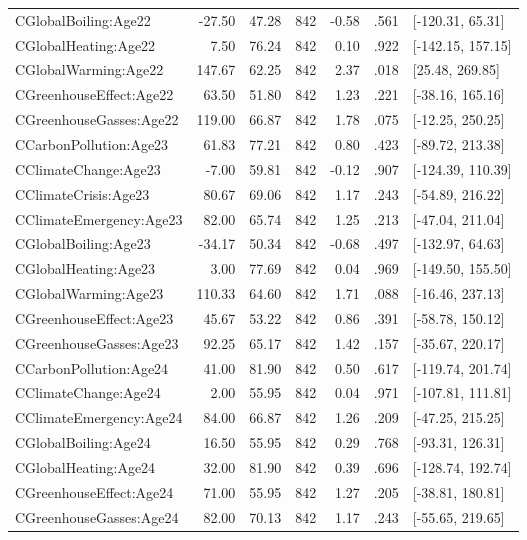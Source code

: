 \begin{table}[ht]
\begin{tabular}{lrrrrrl}
  CGlobalBoiling:Age22 & -27.50 & 47.28 & 842 & -0.58 & .561 & [-120.31, 65.31] \\ 
  CGlobalHeating:Age22 & 7.50 & 76.24 & 842 & 0.10 & .922 & [-142.15, 157.15] \\ 
  CGlobalWarming:Age22 & 147.67 & 62.25 & 842 & 2.37 & .018 & [25.48, 269.85] \\ 
  CGreenhouseEffect:Age22 & 63.50 & 51.80 & 842 & 1.23 & .221 & [-38.16, 165.16] \\ 
  CGreenhouseGasses:Age22 & 119.00 & 66.87 & 842 & 1.78 & .075 & [-12.25, 250.25] \\ 
  CCarbonPollution:Age23 & 61.83 & 77.21 & 842 & 0.80 & .423 & [-89.72, 213.38] \\ 
  CClimateChange:Age23 & -7.00 & 59.81 & 842 & -0.12 & .907 & [-124.39, 110.39] \\ 
  CClimateCrisis:Age23 & 80.67 & 69.06 & 842 & 1.17 & .243 & [-54.89, 216.22] \\ 
  CClimateEmergency:Age23 & 82.00 & 65.74 & 842 & 1.25 & .213 & [-47.04, 211.04] \\ 
  CGlobalBoiling:Age23 & -34.17 & 50.34 & 842 & -0.68 & .497 & [-132.97, 64.63] \\ 
  CGlobalHeating:Age23 & 3.00 & 77.69 & 842 & 0.04 & .969 & [-149.50, 155.50] \\ 
  CGlobalWarming:Age23 & 110.33 & 64.60 & 842 & 1.71 & .088 & [-16.46, 237.13] \\ 
  CGreenhouseEffect:Age23 & 45.67 & 53.22 & 842 & 0.86 & .391 & [-58.78, 150.12] \\ 
  CGreenhouseGasses:Age23 & 92.25 & 65.17 & 842 & 1.42 & .157 & [-35.67, 220.17] \\ 
  CCarbonPollution:Age24 & 41.00 & 81.90 & 842 & 0.50 & .617 & [-119.74, 201.74] \\ 
  CClimateChange:Age24 & 2.00 & 55.95 & 842 & 0.04 & .971 & [-107.81, 111.81] \\ 
  CClimateEmergency:Age24 & 84.00 & 66.87 & 842 & 1.26 & .209 & [-47.25, 215.25] \\ 
  CGlobalBoiling:Age24 & 16.50 & 55.95 & 842 & 0.29 & .768 & [-93.31, 126.31] \\ 
  CGlobalHeating:Age24 & 32.00 & 81.90 & 842 & 0.39 & .696 & [-128.74, 192.74] \\ 
  CGreenhouseEffect:Age24 & 71.00 & 55.95 & 842 & 1.27 & .205 & [-38.81, 180.81] \\ 
  CGreenhouseGasses:Age24 & 82.00 & 70.13 & 842 & 1.17 & .243 & [-55.65, 219.65] \\ 

\end{tabular}
\end{table}
